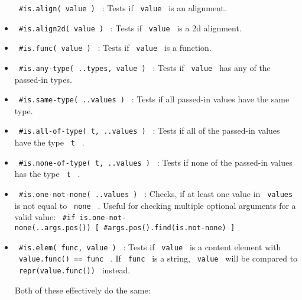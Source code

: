 \begin{itemize}
  \texttt{\ \#is.align(\ value\ )\ } : Tests if \texttt{\ value\ } is an
  alignment.
\item
  \texttt{\ \#is.align2d(\ value\ )\ } : Tests if \texttt{\ value\ } is
  a 2d alignment.
\item
  \texttt{\ \#is.func(\ value\ )\ } : Tests if \texttt{\ value\ } is a
  function.
\item
  \texttt{\ \#is.any-type(\ ..types,\ value\ )\ } : Tests if
  \texttt{\ value\ } has any of the passed-in types.
\item
  \texttt{\ \#is.same-type(\ ..values\ )\ } : Tests if all passed-in
  values have the same type.
\item
  \texttt{\ \#is.all-of-type(\ t,\ ..values\ )\ } : Tests if all of the
  passed-in values have the type \texttt{\ t\ } .
\item
  \texttt{\ \#is.none-of-type(\ t,\ ..values\ )\ } : Tests if none of
  the passed-in values has the type \texttt{\ t\ } .
\item
  \texttt{\ \#is.one-not-none(\ ..values\ )\ } : Checks, if at least one
  value in \texttt{\ values\ } is not equal to \texttt{\ none\ } .
  Useful for checking multiple optional arguments for a valid value:
  \texttt{\ \#if\ is.one-not-none(..args.pos())\ {[}\ \#args.pos().find(is.not-none)\ {]}\ }
\item
  \texttt{\ \#is.elem(\ func,\ value\ )\ } : Tests if \texttt{\ value\ }
  is a content element with \texttt{\ value.func()\ ==\ func\ } . If
  \texttt{\ func\ } is a string, \texttt{\ value\ } will be compared to
  \texttt{\ repr(value.func())\ } instead.

  Both of these effectively do the same:


\end{itemize}
